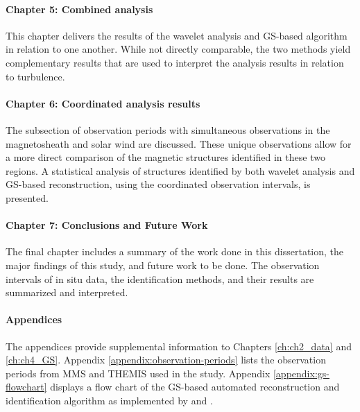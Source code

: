 \paragraph*{Chapter 5: Combined analysis}
This chapter delivers the results of the wavelet analysis and GS-based algorithm in relation to one another. While not directly comparable, the two methods yield complementary results that are used to interpret the analysis results in relation to turbulence.

\paragraph*{Chapter 6: Coordinated analysis results}
The subsection of observation periods with simultaneous observations in the magnetosheath and solar wind are discussed. These unique observations allow for a more direct comparison of the magnetic structures identified in these two regions. A statistical analysis of structures identified by both wavelet analysis and GS-based reconstruction, using the coordinated observation intervals, is presented.

\paragraph*{Chapter 7: Conclusions and Future Work}
The final chapter includes a summary of the work done in this dissertation, the major findings of this study, and future work to be done. The observation intervals of in situ data, the identification methods, and their results are summarized and interpreted.

\paragraph*{Appendices}
The appendices provide supplemental information to Chapters \ref{ch:ch2_data} and \ref{ch:ch4_GS}. Appendix \ref{appendix:observation-periods} lists the observation periods from MMS and THEMIS used in the study. Appendix \ref{appendix:gs-flowchart} displays a flow chart of the GS-based automated reconstruction and identification algorithm as implemented by \cite{Hu:2018} and \cite{Zheng:2018}.